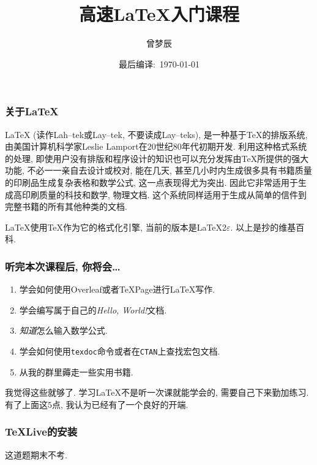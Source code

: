 \documentclass{beamer}
\title{高速\LaTeX{}入门课程}
\author{曾梦辰}
\institute{北京师范大学OM学社}
\date{最后编译:\ \today}
\begin{document}
\maketitle

\begin{frame}
    \frametitle{关于\LaTeX{}}
    LaTeX (读作Lah--tek或Lay--tek, 不要读成Lay--teks), 是一种基于TeX的排版系统, 由美国计算机科学家Leslie Lamport在20世纪80年代初期开发.
    利用这种格式系统的处理, 即使用户没有排版和程序设计的知识也可以充分发挥由TeX所提供的强大功能, 不必一一亲自去设计或校对, 能在几天, 甚至几小时内生成很多具有书籍质量的印刷品生成复杂表格和数学公式, 这一点表现得尤为突出.
    因此它非常适用于生成高印刷质量的科技和数学, 物理文档.
    这个系统同样适用于生成从简单的信件到完整书籍的所有其他种类的文档.

    LaTeX使用TeX作为它的格式化引擎, 当前的版本是\LaTeX{2$\varepsilon$}.\pause
    \vspace{1cm}
    以上是抄的维基百科.
\end{frame}

\begin{frame}
    \frametitle{听完本次课程后, 你将会\dots}
    \begin{enumerate}[(1)]
        \item 学会如何使用Overleaf或者\TeX{}Page进行\LaTeX{}写作.
        \item 学会编写属于自己的\emph{Hello, World!}文档.
        \item \emph{知道}怎么输入数学公式.
        \item 学会如何使用\Verb|texdoc|命令或者在\Verb|CTAN|上查找宏包文档.
        \item 从我的群里薅走一些实用书籍.
    \end{enumerate}\pause
    我觉得这些就够了.
    学习\LaTeX{}不是听一次课就能学会的, 需要自己下来勤加练习.
    有了上面这$5$点, 我认为已经有了一个良好的开端.
\end{frame}

\begin{frame}
    \frametitle{\TeX{}Live的安装}
    这道题期末不考.
\end{frame}
\end{document}
